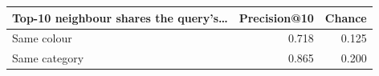 \begin{tabular}{lrr}
\toprule
Top-10 neighbour shares the query's\ldots & Precision@10 & Chance \\
\midrule
Same colour & 0.718 & 0.125 \\
Same category & 0.865 & 0.200 \\
\bottomrule
\end{tabular}
